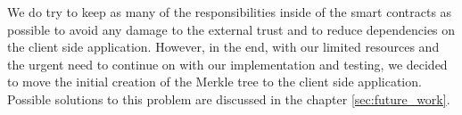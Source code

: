 We do try to keep as many of the responsibilities inside of the smart contracts as possible to avoid any damage to the external trust and to reduce dependencies on the client side application. However, in the end, with our limited resources and the urgent need to continue on with our implementation and testing, we decided to move the initial creation of the Merkle tree to the client side application. Possible solutions to this problem are discussed in the chapter \ref{sec:future_work}.